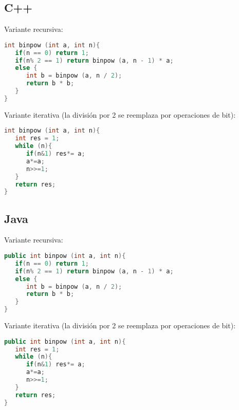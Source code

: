 \subsection{C++}

Variante recursiva:

\begin{lstlisting}[language=C++]
int binpow (int a, int n){
   if(n == 0) return 1; 
   if(n% 2 == 1) return binpow (a, n - 1) * a; 
   else {
      int b = binpow (a, n / 2); 
      return b * b;
   }
}
\end{lstlisting}

Variante iterativa (la división por 2 se reemplaza por operaciones de bit):

\begin{lstlisting}[language=C++]
int binpow (int a, int n){
   int res = 1; 
   while (n){
      if(n&1) res*= a;
      a*=a;
      n>>=1;
   } 
   return res;
}
\end{lstlisting}

\subsection{Java}

Variante recursiva:

\begin{lstlisting}[language=C++]
public int binpow (int a, int n){
   if(n == 0) return 1; 
   if(n% 2 == 1) return binpow (a, n - 1) * a; 
   else {
      int b = binpow (a, n / 2); 
      return b * b;
   }
}
\end{lstlisting}

Variante iterativa (la división por 2 se reemplaza por operaciones de bit):

\begin{lstlisting}[language=C++]
public int binpow (int a, int n){
   int res = 1; 
   while (n){
      if(n&1) res*= a;
      a*=a;
      n>>=1;
   } 
   return res;
}
\end{lstlisting}